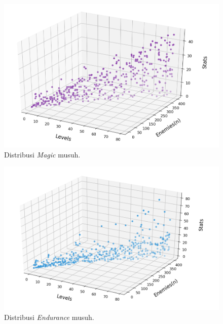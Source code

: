 \begin{figure} [!h] \centering
	\includegraphics[scale=0.55]{img/EnemyMagicDistrib.png}
	\caption{Distribusi \textit{Magic} musuh.}
	\label{fig:enemy_mag_distrib}
\end{figure}

\begin{figure} [!h] \centering
	\includegraphics[scale=0.58]{img/EnemyEnduranceDistrib.png}
	\caption{Distribusi \textit{Endurance} musuh.}
	\vspace{2ex}
	\label{fig:enemy_endr_distrib}
\end{figure}

